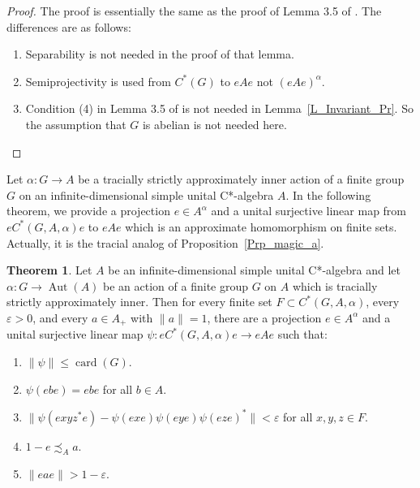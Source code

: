 \documentclass[10pt]{amsart}
\newcounter{TmpEnumi}
\numberwithin{equation}{section}
\theoremstyle{definition}
\newtheorem{thm}{Theorem}[section]
\newcommand{\af}{\alpha}
\newcommand{\ep}{\varepsilon}
\newcommand{\card}{{\operatorname{card}}}
\newcommand{\Aut}{{\operatorname{Aut}}}
\newcommand{\ca}{C*-algebra}
\newcommand{\CGAa}{C^* (G, A, \af)}
\newcommand{\Lem}[1]{Lemma~\ref{#1}}
\begin{document}
\begin{proof}
The proof is essentially the same as the proof of Lemma 3.5 of \cite{Ph11}.
The differences  are as follows:
\begin{enumerate}
\item
Separability is not needed in the proof of that lemma.
\item
Semiprojectivity is used from $C^*(G)$ to $e A e$ not $(e A e)^\alpha$.
\item
Condition (4) in Lemma 3.5 of \cite{Ph11} is not needed in \Lem{L_Invariant_Pr}.
 So the assumption that $G$ is abelian   is not needed here.
\end{enumerate}
\end{proof}
%
Let $\alpha\colon G \to A$ be a tracially strictly approximately inner action of a finite group $G$
on an infinite-dimensional simple unital C*-algebra $A$. In the following theorem, we provide
a projection $e \in A^{\alpha}$ and
a unital surjective linear map  from $e C^*(G, A, \alpha) e$
to $e A e$ which is an approximate homomorphism on finite sets. Actually, it is the tracial analog of Proposition~\ref{Prp_magic_a}.
%
\begin{thm}\label{Thm_magic_b}
Let $A$ be an infinite-dimensional simple  unital \ca{} 
 and let  $\alpha \colon  G \to \Aut(A)$ be an action of a 
finite  group $G$ on $A$ which is tracially  strictly  approximately inner. 
Then  for every finite
set $F \subset \CGAa$, every $\ep > 0$, and every $a \in A_+$ with $\| a \|=1$, 
 there are a projection  $e \in A^{\alpha}$ and  a unital surjective  linear map
$\psi \colon e \CGAa e \to e A e$ such that:
\begin{enumerate}
\item \label{Thm_magic_b.1}
$\| \psi \| \leq \card (G)$.
\item \label{Thm_magic_b.2}
$\psi (e b e) = e b e$ for all $b \in A$.
\item \label{Thm_magic_b.3}
$\| \psi (e xy z^* e) - \psi (e x e) \psi (e y e) \psi (e z e)^*\| < \ep$ 
for all $x, y, z \in F$.
\item \label{Thm_magic_b.4}
$1-e \precsim_A a$.
\item \label{Thm_magic_b.5}
$\| e a e \| > 1-\ep$.
%
\setcounter{TmpEnumi}{\value{enumi}}
\end{enumerate}
\end{thm}
\end{document}
